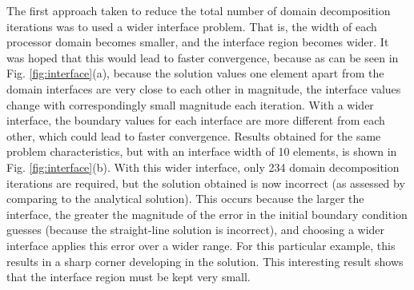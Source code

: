 \documentclass[10pt]{article}
\begin{document}
The first approach taken to reduce the total number of domain decomposition iterations was to used a wider interface problem. That is, the width of each processor domain becomes smaller, and the interface region becomes wider. It was hoped that this would lead to faster convergence, because as can be seen in Fig. \ref{fig:interface}(a), because the solution values one element apart from the domain interfaces are very close to each other in magnitude, the interface values change with correspondingly small magnitude each iteration. With a wider interface, the boundary values for each interface are more different from each other, which could lead to faster convergence. Results obtained for the same problem characteristics, but with an interface width of 10 elements, is shown in Fig. \ref{fig:interface}(b). With this wider interface, only 234 domain decomposition iterations are required, but the solution obtained is now incorrect (as assessed by comparing to the analytical solution). This occurs because the larger the interface, the greater the magnitude of the error in the initial boundary condition guesses (because the straight-line solution is incorrect), and choosing a wider interface applies this error over a wider range. For this particular example, this results in a sharp corner developing in the solution. This interesting result shows that the interface region must be kept very small. 
\end{document}

